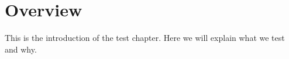 
\section{Overview}
This is the introduction of the test chapter. Here we will explain what we test and why.


